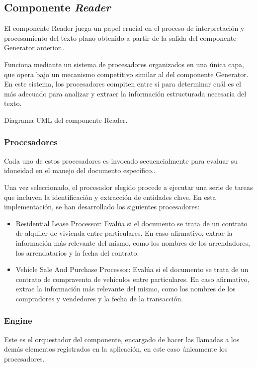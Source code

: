 \subsection*{Componente \textit{Reader}}\label{subsec:chapter_4.reader_component}
El componente Reader juega un papel crucial en el proceso de interpretación y procesamiento del texto plano obtenido a
partir de la salida del componente Generator anterior..

Funciona mediante un sistema de procesadores organizados en una única capa, que opera bajo un mecanismo competitivo
similar al del componente Generator. En este sistema, los procesadores compiten entre sí para determinar cuál es el más
adecuado para analizar y extraer la información estructurada necesaria del texto.

Diagrama UML del componente Reader.

\subsubsection*{Procesadores}
Cada uno de estos procesadores es invocado secuencialmente para evaluar su idoneidad en el manejo del documento
específico..

Una vez seleccionado, el procesador elegido procede a ejecutar una serie de tareas que incluyen la identificación y
extracción de entidades clave. En esta implementación, se han desarrollado los siguientes procesadores:

\begin{itemize}
    \item Residential Lease Processor: Evalúa si el documento se trata de un contrato de alquiler de vivienda entre
    particulares. En caso afirmativo, extrae la información más relevante del mismo, como los nombres de los
    arrendadores, los arrendatarios y la fecha del contrato.
    \item Vehicle Sale And Purchase Processor: Evalúa si el documento se trata de un contrato de compraventa de
    vehículos
    entre particulares. En caso afirmativo, extrae la información más relevante del mismo, como los nombres de los
    compradores y vendedores y la fecha de la transacción.
\end{itemize}

\subsubsection*{Engine}
Este es el orquestador del componente, encargado de hacer las llamadas a los demás elementos registrados en la
aplicación, en este caso únicamente los procesadores.


